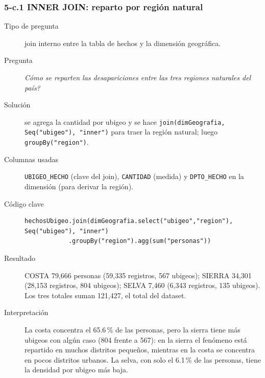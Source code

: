 \subsubsection*{5-c.1 \textbar{} INNER JOIN: reparto por regi\'on natural}
\begin{description}
\item[Tipo de pregunta] join interno entre la tabla de hechos y la dimensi\'on geogr\'afica.
\item[Pregunta] \emph{C\'omo se reparten las desapariciones entre las tres regiones naturales del
      pa\'is?}
\item[Soluci\'on] se agrega la cantidad por ubigeo y se hace \texttt{join(dimGeografia,
      Seq("ubigeo"), "inner")} para traer la regi\'on natural; luego \texttt{groupBy("region")}.
\item[Columnas usadas] \texttt{UBIGEO\_HECHO} (clave del join), \texttt{CANTIDAD} (medida) y
      \texttt{DPTO\_HECHO} en la dimensi\'on (para derivar la regi\'on).
\item[C\'odigo clave]
\begin{lstlisting}[style=scala]
hechosUbigeo.join(dimGeografia.select("ubigeo","region"), Seq("ubigeo"), "inner")
            .groupBy("region").agg(sum("personas"))
\end{lstlisting}
\item[Resultado] COSTA 79,666 personas (59,335 registros, 567 ubigeos); SIERRA 34,301 (28,153
      registros, 804 ubigeos); SELVA 7,460 (6,343 registros, 135 ubigeos). Los tres totales suman
      121,427, el total del dataset.
\item[Interpretaci\'on] La costa concentra el 65.6\,\% de las personas, pero la sierra tiene m\'as
      ubigeos con alg\'un caso (804 frente a 567): en la sierra el fen\'omeno est\'a repartido en
      muchos distritos peque\~nos, mientras en la costa se concentra en pocos distritos urbanos.
      La selva, con solo el 6.1\,\% de las personas, tiene la densidad por ubigeo m\'as baja.
\end{description}

